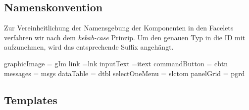 \newcommand{\ftable}[1]{\begin{sidewaystable}
\begin{tabular}[H]{ |m{1.5cm}| m{1.5cm}| m{3cm}| m{7cm} |m{4cm}| m{4cm}| }
    \toprule
    \textbf{ID} & \textbf{Typ} & \textbf{Beschreibung} & \textbf{Binding} & \textbf{Constraints} & \textbf{Validator \newline Converter} \\
    \midrule
    #1
\end{tabular}
\end{sidewaystable}
}

\newcommand{\fentry}[6]{\footnotesize#1 &\footnotesize#2 &\footnotesize#3 &\footnotesize#4 &\footnotesize#5 &\footnotesize#6\\\hline}


\subsection{Namenskonvention}

Zur Vereinheitlichung der Namensgebung der Komponenten in den Facelets verfahren wir nach dem \emph{kebab-case} Prinzip. Um den genauen Typ in die ID mit aufzunehmen, wird das entsprechende Suffix angehängt.

 graphicImage = gIm link =lnk inputText =itext commandButton = cbtn messages = msgs dataTable = dtbl selectOneMenu = slctom panelGrid = pgrd

\subsection{Templates}

